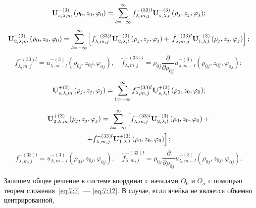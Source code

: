\begin{equation}
{\bf{U}}_{s,\lambda ,m}^{ - (3)}\left( {{\rho _0},{z_0},{\varphi _0}} \right) = \sum\limits_{l =  - \infty }^\infty  {f_{\lambda ,m,j}^{ - (33)l}{\bf{U}}_{s,\lambda ,l}^{ - (3)}\left( {{\rho _j},{z_j},{\varphi _j}} \right)};
\label{eq:7:9}
\end{equation}
\begin{equation}
{\bf{U}}_{2,\lambda ,m}^{ - (3)}\left( {{\rho _0},{z_0},{\varphi _0}} \right) = \sum\limits_{l =  - \infty }^\infty  {\left[ {f_{\lambda ,m,j}^{ - (33)l}{\bf{U}}_{2,\lambda ,l}^{ - (3)}\left( {{\rho _j},{z_j},{\varphi _j}} \right) + } \right.} \left. {\tilde f_{\lambda ,m,j}^{ - (33)l}{\bf{U}}_{1,\lambda ,l}^{ - (3)}\left( {{\rho _j},{z_j},{\varphi _j}} \right)} \right];
\label{eq:7:10}
\end{equation}
$$
f_{\lambda ,m,j}^{ - (33)l} = u_{\lambda ,m - l}^{ - (3)}\left( {{\rho _{0j}},{z_{0j}},{\varphi _{0j}}} \right),\quad
\tilde f_{\lambda ,m,j}^{ - (33)l} = {\rho _{0j}}\frac{\partial }{{\partial {\rho _{0j}}}}u_{\lambda ,m - l}^{ - (3)}\left( {{\rho _{0j}},{z_{0j}},{\varphi _{0j}}} \right);
$$

\begin{equation}
{\bf{U}}_{s,\lambda ,m}^{ + (3)}\left( {{\rho _j},{z_j},{\varphi _j}} \right) = \sum\limits_{l =  - \infty }^\infty  {f_{\lambda ,m,j}^{ - (33)l}{\bf{U}}_{s,\lambda ,l}^{ + (3)}\left( {{\rho _0},{z_0},{\varphi _0}} \right)};
\label{eq:7:11}
\end{equation}

\begin{multline}
{\bf{U}}_{2,\lambda ,m}^{ + (3)}\left( {{\rho _j},{z_j},{\varphi _j}} \right) = \sum\limits_{l =  - \infty }^\infty  {\left[ {f_{\lambda ,m,j}^{ - (33)l}{\bf{U}}_{2,\lambda ,l}^{ - (3)}\left( {{\rho _0},{z_0},{\varphi _0}} \right) + } \right.} \\
\left. { + \tilde f_{\lambda ,m,j}^{ - (33)l}{\bf{U}}_{1,\lambda ,l}^{ + (3)}\left( {{\rho _0},{z_0},{\varphi _0}} \right)} \right];
\label{eq:7:12}
\end{multline}
$$
f_{\lambda ,m,j}^{ - (33)l} = u_{\lambda ,m - l}^{ - (3)}\left( {{\rho _{0j}},{z_{0j}},{\varphi _{0j}}} \right),\quad
\tilde f_{\lambda ,m,j}^{ - (33)l} = {\rho _{0j}}\frac{\partial }{{\partial {\rho _{0j}}}}u_{\lambda ,m - l}^{ - (3)}\left( {{\rho _{0j}},{z_{0j}},{\varphi _{0j}}} \right).
$$

Запишем общее решение в системе координат с началами $O_0$ и $O_\alpha$ с помощью теорем сложения~\eqref{eq:7:7}~--- \eqref{eq:7:12}. В случае, если ячейка не является объемно центрированной,

